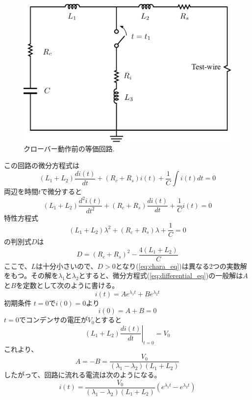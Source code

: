 \documentclass[book,openany]{jlreq}
\theoremstyle{definition}
\begin{document}
\begin{figure}[htbp]
  \begin{center}
    \includegraphics[width=12cm]{figs/BeforeCRB.pdf}
    \caption{クローバー動作前の等価回路.}
    \label{fig:BeforeCrowbar}
  \end{center}
\end{figure}
%
この回路の微分方程式は
%
\begin{equation}
  (L_1+L_2) \frac{di(t)}{dt} + (R_c+R_s) i(t) + \frac{1}{C} \int i(t) dt = 0
\end{equation}
%
両辺を時間$t$で微分すると
%
\begin{equation}
  (L_1+L_2)\frac{d^2i(t)}{dt^2} + (R_c+R_s) \frac{di(t)}{dt} + \frac{1}{C} i(t) = 0
  \label{eq:differential_eq}
\end{equation}
%
特性方程式
%
\begin{equation}
  (L_1+L_2)\lambda^2 + (R_c+R_s)  \lambda + \frac{1}{C} = 0
  \label{eq:chara_eq}
\end{equation}
%
の判別式$D$は
%
\begin{equation}
  D = (R_c+R_s)^2 -\frac{4 (L_1+L_2)}{C}
\end{equation}
%
ここで、$L$は十分小さいので、$D>0$となり(\ref{eq:chara_eq})は異なる2つの実数解をもつ。その解を$\lambda_1$と$\lambda_2$とすると、微分方程式(\ref{eq:differential_eq})の一般解は$A$と$B$を定数として次のように書ける。
%
\begin{equation}
  i(t) = A e^{\lambda_1 t} + B e^{\lambda_2 t}
\end{equation}
%
初期条件 $t=0$で$i(0)=0$より
%
\begin{equation}
  i(0) = A + B = 0
\end{equation}
%
$t=0$でコンデンサの電圧が$V_0$とすると
%
\begin{equation}
  (L_1+L_2)\left. \frac{di(t)}{dt} \right|_{t=0}= V_0
\end{equation}
%
これより、
%
\begin{equation}
  A = -B = \frac{V_0}{(\lambda_1 - \lambda_2)(L_1+L_2)}
\end{equation}
%
したがって、回路に流れる電流は次のようになる。
%
\begin{equation}
  i(t) = \frac{V_0}{(\lambda_1 - \lambda_2)(L_1+L_2)} \left(e^{\lambda_1 t} - e^{\lambda_2 t}\right)
\end{equation}
\end{document}
